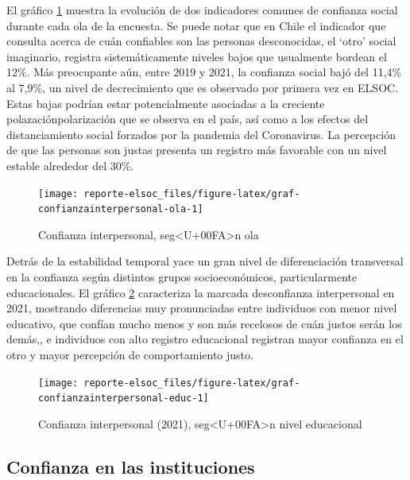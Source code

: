 \documentclass[
  12pt,
]{book}
\begin{document}
El gráfico \ref{fig:graf-confianzainterpersonal-ola} muestra la evolución de dos indicadores comunes de confianza social durante cada ola de la encuesta. Se puede notar que en Chile el indicador que consulta acerca de cuán confiables son las personas desconocidas, el `otro' social imaginario, registra sistemáticamente niveles bajos que usualmente bordean el 12\%. Más preocupante aún, entre 2019 y 2021, la confianza social bajó del 11,4\% al 7,9\%, un nivel de decrecimiento que es observado por primera vez en ELSOC. Estas bajas podrían estar potencialmente asociadas a la creciente polazaciónpolarización que se observa en el país, así como a los efectos del distanciamiento social forzados por la pandemia del Coronavirus. La percepción de que las personas son justas presenta un registro más favorable con un nivel estable alrededor del 30\%.

\begin{figure}

{\centering \texttt{[image: reporte-elsoc\_files/figure-latex/graf-confianzainterpersonal-ola-1]} 

}

\caption{Confianza interpersonal, seg<U+00FA>n ola}\label{fig:graf-confianzainterpersonal-ola}
\end{figure}

Detrás de la estabilidad temporal yace un gran nivel de diferenciación transversal en la confianza según distintos grupos socioeconómicos, particularmente educacionales. El gráfico \ref{fig:graf-confianzainterpersonal-educ} caracteriza la marcada desconfianza interpersonal en 2021, mostrando diferencias muy pronunciadas entre individuos con menor nivel educativo, que confían mucho menos y son más recelosos de cuán justos serán los demás,, e individuos con alto registro educacional registran mayor confianza en el otro y mayor percepción de comportamiento justo.

\begin{figure}

{\centering \texttt{[image: reporte-elsoc\_files/figure-latex/graf-confianzainterpersonal-educ-1]} 

}

\caption{Confianza interpersonal (2021), seg<U+00FA>n nivel educacional}\label{fig:graf-confianzainterpersonal-educ}
\end{figure}

\hypertarget{confianza-en-las-instituciones}{%
\subsection*{Confianza en las instituciones}\label{confianza-en-las-instituciones}}
\end{document}
